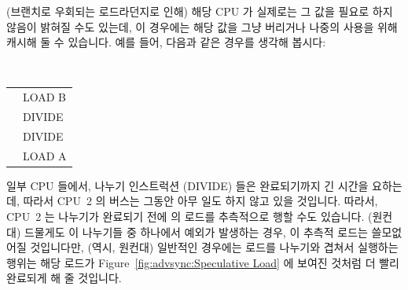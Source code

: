 \begin{enumerate}
(브랜치로 우회되는 로드라던지로 인해) 해당 CPU 가 실제로는 그 값을 필요로 하지
않음이 밝혀질 수도 있는데, 이 경우에는 해당 값을 그냥 버리거나 나중의 사용을
위해 캐시해 둘 수 있습니다.
예를 들어, 다음과 같은 경우를 생각해 봅시다:

\vspace{5pt}
\begin{minipage}[t]{\columnwidth}
\tt
\scriptsize
\begin{tabular}{l|p{1.5in}}
	\nf{CPU 1} &	\nf{CPU 2} \\
	\hline
		&	LOAD B \\
		&	DIVIDE \\
		&	DIVIDE \\
		&	LOAD A \\
\end{tabular}
\end{minipage}
\vspace{5pt}

일부 CPU 들에서, 나누기 인스트럭션 (DIVIDE) 들은 완료되기까지 긴 시간을
요하는데, 따라서 CPU~2 의 버스는 그동안 아무 일도 하지 않고 있을 것입니다.
따라서, CPU~2 는 나누기가 완료되기 전에  의 로드를 추측적으로 행할 수도
있습니다.
(원컨대) 드물게도 이 나누기들 중 하나에서 예외가 발생하는 경우, 이 추측적
로드는 쓸모없어질 것입니다만, (역시, 원컨대) 일반적인 경우에는 로드를 나누기와
겹쳐서 실행하는 행위는 해당 로드가 Figure~\ref{fig:advsync:Speculative Load} 에
보여진 것처럼 더 빨리 완료되게 해 줄 것입니다.

\end{enumerate}

